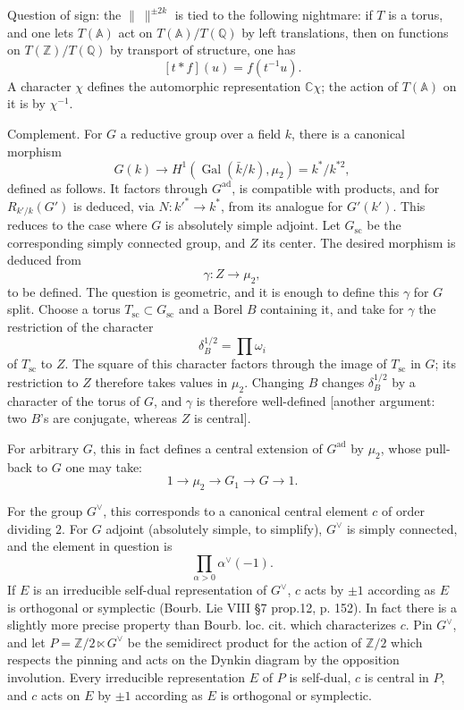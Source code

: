 \documentclass[11pt]{article}
\newcommand{\Gal}{\operatorname{Gal}}
\newcommand{\A}{\mathbb A}
\newcommand{\normchar}{\|\ \|}
\begin{document}
Question of sign: the \(\normchar^{\pm2k}\) is tied to the following nightmare: if \(T\) is a torus, and one lets \(T(\A)\) act on \(T(\A)/T(\mathbb Q)\) by left translations, then on functions on \(T(\mathbb Z)/T(\mathbb Q)\) by transport of structure, one has
\[
[t\ast f](u)=f(t^{-1}u).
\]
A character \(\chi\) defines the automorphic representation \(\mathbb C\chi\); the action of \(T(\A)\) on it is by \(\chi^{-1}\).

Complement. For \(G\) a reductive group over a field \(k\), there is a canonical morphism
\[
G(k)\longrightarrow H^1(\Gal(\bar k/k),\mu_2)=k^\ast/k^{\ast2},
\]
defined as follows. It factors through \(G^{\mathrm{ad}}\), is compatible with products, and for \(R_{k'/k}(G')\) is deduced, via \(N:k'^\ast\to k^\ast\), from its analogue for \(G'(k')\). This reduces to the case where \(G\) is absolutely simple adjoint. Let \(G_{\mathrm{sc}}\) be the corresponding simply connected group, and \(Z\) its center. The desired morphism is deduced from
\[
\gamma:Z\longrightarrow \mu_2,
\]
to be defined. The question is geometric, and it is enough to define this \(\gamma\) for \(G\) split. Choose a torus \(T_{\mathrm{sc}}\subset G_{\mathrm{sc}}\) and a Borel \(B\) containing it, and take for \(\gamma\) the restriction of the character
\[
\delta_B^{1/2}=\prod \omega_i
\]
of \(T_{\mathrm{sc}}\) to \(Z\). The square of this character factors through the image of \(T_{\mathrm{sc}}\) in \(G\); its restriction to \(Z\) therefore takes values in \(\mu_2\). Changing \(B\) changes \(\delta_B^{1/2}\) by a character of the torus of \(G\), and \(\gamma\) is therefore well-defined [another argument: two \(B\)'s are conjugate, whereas \(Z\) is central].

For arbitrary \(G\), this in fact defines a central extension of \(G^{\mathrm{ad}}\) by \(\mu_2\), whose pull-back to \(G\) one may take:
\[
1\longrightarrow \mu_2\longrightarrow G_1\longrightarrow G\longrightarrow 1.
\]

For the group \(G^\vee\), this corresponds to a canonical central element \(c\) of order dividing \(2\). For \(G\) adjoint (absolutely simple, to simplify), \(G^\vee\) is simply connected, and the element in question is
\[
\prod_{\alpha>0}\alpha^\vee(-1).
\]
If \(E\) is an irreducible self-dual representation of \(G^\vee\), \(c\) acts by \(\pm1\) according as \(E\) is orthogonal or symplectic (Bourb. Lie VIII \S7 prop.12, p. 152). In fact there is a slightly more precise property than Bourb. loc. cit. which characterizes \(c\). Pin \(G^\vee\), and let \(P=\mathbb Z/2\ltimes G^\vee\) be the semidirect product for the action of \(\mathbb Z/2\) which respects the pinning and acts on the Dynkin diagram by the opposition involution. Every irreducible representation \(E\) of \(P\) is self-dual, \(c\) is central in \(P\), and \(c\) acts on \(E\) by \(\pm1\) according as \(E\) is orthogonal or symplectic.
\end{document}

